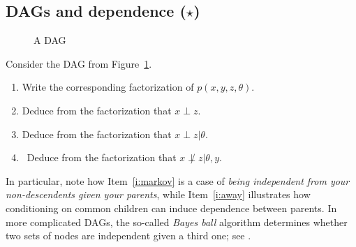 \documentclass{article}
\begin{document}
\subsection{DAGs and dependence ($\star$)}
\begin{figure}
  \centering
\caption{A DAG}
\label{f:dag}
\end{figure}

Consider the DAG from Figure~\ref{f:dag}.
\begin{enumerate}
\item Write the corresponding factorization of $p(x,y,z,\theta)$.
\item Deduce from the factorization that $x\perp z$.
\item\label{i:markov} Deduce from the factorization that $x\perp z\vert\theta$.
\item\label{i:away} Deduce from the factorization that $x\not\perp z\vert \theta, y$.
\end{enumerate}
In particular, note how Item~\ref{i:markov} is a case of \emph{being independent from your non-descendents given your parents}, while Item~\ref{i:away} illustrates how conditioning on common children can induce dependence between parents. In more complicated DAGs, the so-called \emph{Bayes ball} algorithm determines whether two sets of nodes are independent given a third one; see \cite[Section 10.5]{Mur12}.
\end{document}
